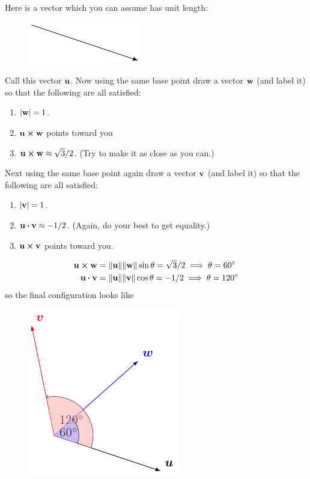 \documentclass[12pt,answers]{exam}
\begin{document}
\begin{questions}
	\question Here is a vector which you can assume has unit length:
	\begin{figure}[H]
		\centering
		\vspace{.5in}
		\includegraphics{graphics/2018-fall-final-vb-1.pdf}
		\vspace{.5in}
	\end{figure}
	Call this vector $\vb{u}$. Now using the same base point draw a vector $\vb{w}$ (and label it) so that the following are all satisfied:
	\begin{enumerate}[label=(\alph*)]
		\item $|\vb{w}| = 1$.
		\item $\vb{u} \cross \vb{w}$ points toward you
		\item $\vb{u} \cross \vb{w} \approx \sqrt 3/2$. (Try to make it as close as you can.)
	\end{enumerate}
	Next using the same base point again draw a vector $\vb{v}$ (and label it) so that the following are all satisfied:
	\begin{enumerate}[label=(\alph*)]
		\item $|\vb{v}| = 1$.
		\item $\vb{u} \vdot \vb{v} \approx -1/2$. (Again, do your best to get equality.)
		\item $\vb{u} \cross \vb v$ points toward you.
	\end{enumerate}
	\begin{solution}
		
		\begin{align*}
			\vb u \cross \vb w &= \| \vb u \| \|\vb w\| \sin \theta = \sqrt 3/2 \implies \theta = 60^\circ \\ 
			\vb u \vdot \vb v &= \| \vb u \| \|\vb v\| \cos \theta = -1/2 \implies \theta = 120^\circ
		\end{align*}
		so the final configuration looks like
		\begin{figure}[H]
			\centering
			\includegraphics{graphics/2018-fall-final-vb-1-sol.pdf}
		\end{figure}
	\end{solution}


\end{questions}
\end{document}
